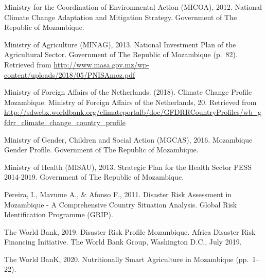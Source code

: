 \documentclass[
]{book}
\begin{document}
Ministry for the Coordination of Environmental Action (MICOA), 2012. National Climate Change Adaptation and Mitigation Strategy. Government of The Republic of Mozambique.

Ministry of Agriculture (MINAG), 2013. National Investment Plan of the Agricultural Sector. Government of The Republic of Mozambique (p.~82). Retrieved from \url{http://www.masa.gov.mz/wp-content/uploads/2018/05/PNISAmoz.pdf}

Ministry of Foreign Affairs of the Netherlands. (2018). Climate Change Profile Mozambique. Ministry of Foreign Affairs of the Netherlands, 20. Retrieved from \url{http://sdwebx.worldbank.org/climateportalb/doc/GFDRRCountryProfiles/wb_gfdrr_climate_change_country_profile}

Ministry of Gender, Children and Social Action (MGCAS), 2016. Mozambique Gender Profile. Government of The Republic of Mozambique.

Ministry of Health (MISAU), 2013. Strategic Plan for the Health Sector PESS 2014-2019. Government of The Republic of Mozambique.

Pereira, I., Mavume A., \& Afonso F., 2011. Disaster Risk Assessment in Mozambique - A Comprehensive Country Situation Analysis. Global Risk Identification Programme (GRIP).

The World Bank, 2019. Disaster Risk Profile Mozambique. Africa Disaster Risk Financing Initiative. The World Bank Group, Washington D.C., July 2019.

The World BanK, 2020. Nutritionally Smart Agriculture in Mozambique (pp.~1--22).

  
\end{document}
